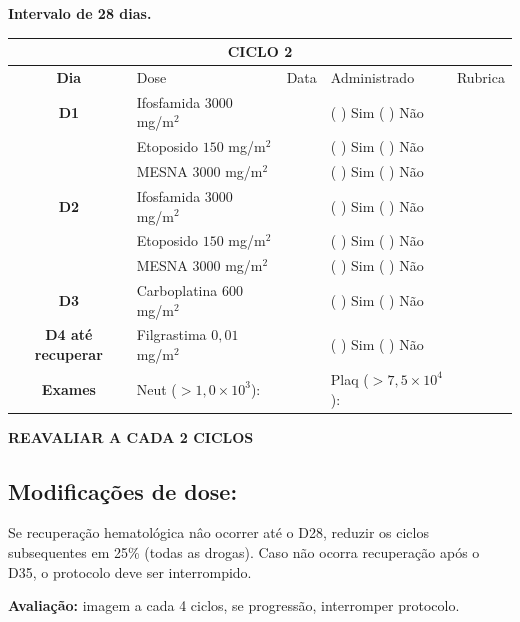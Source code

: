 \documentclass[11pt,a4paper,oldfontcommands]{memoir}
\begin{document}
\begin{center}
\textbf{Intervalo de 28 dias.}
\begin{table}[H]
\begin{tabular}{c|p{5cm}|p{1.4cm}|p{2.8cm}|p{2.5cm}}
	\hline
	\multicolumn{5}{c}{\textbf{CICLO 2}}\\
\hline
    \multicolumn{1}{c|}{\multirow{1}{*}{\textbf{Dia}}}&{Dose}&{Data}&{Administrado}&{Rubrica} \\
    \hline
    \multicolumn{1}{c|}{\multirow{1}{*}{\textbf{D1}}}&{Ifosfamida \(3000\) mg/m\(^2\)}&&{(  ) Sim (  ) Não}&\\
    \multicolumn{1}{c|}{\multirow{1}{*}{\textbf{}}}&{Etoposido \(150\) mg/m\(^2\)}&&{(  ) Sim (  ) Não}&\\
    \multicolumn{1}{c|}{\multirow{1}{*}{\textbf{}}}&{MESNA \(3000\) mg/m\(^2\)}&&{(  ) Sim (  ) Não}&\\
    \multicolumn{1}{c|}{\multirow{1}{*}{\textbf{D2}}}&{Ifosfamida \(3000\) mg/m\(^2\)}&&{(  ) Sim (  ) Não}&\\
    \multicolumn{1}{c|}{\multirow{1}{*}{\textbf{}}}&{Etoposido \(150\) mg/m\(^2\)}&&{(  ) Sim (  ) Não}&\\
    \multicolumn{1}{c|}{\multirow{1}{*}{\textbf{}}}&{MESNA \(3000\) mg/m\(^2\)}&&{(  ) Sim (  ) Não}&\\
     \multicolumn{1}{c|}{\multirow{1}{*}{\textbf{D3}}}&{Carboplatina \(600\) mg/m\(^2\)}&&{(  ) Sim (  ) Não}&\\
    \hline
    \multicolumn{1}{c|}{\multirow{1}{*}{\textbf{D4 até recuperar}}}&{Filgrastima \(0,01\) mg/m\(^2\)}&&{(  ) Sim (  ) Não}&\\
    \hline
    \multicolumn{1}{c|}{\multirow{1}{*}{\textbf{Exames}}}&\multicolumn{2}{l|}{Neut (\(>1,0\times10^3\)):}&{Plaq (\(>7,5\times10^4\)):}&{}\\
    \hline
\end{tabular}
\end{table}
\textbf{REAVALIAR A CADA 2 CICLOS}
\end{center}

\subsection{Modificações de dose:}
Se recuperação hematológica nâo ocorrer até o D28, reduzir os ciclos subsequentes em 25\% (todas as drogas). Caso não ocorra recuperação após o D35, o protocolo deve ser interrompido.

\textbf{Avaliação:} imagem a cada 4 ciclos, se progressão, interromper protocolo.
\end{document}
